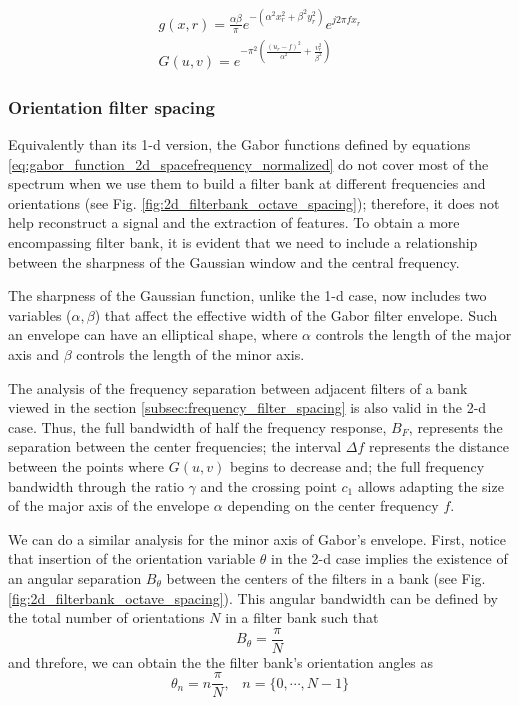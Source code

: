 \begin{equation}\label{eq:gabor_function_2d_spacefrequency_normalized}
    \begin{gathered}
        g(x, r) = \frac{\alpha \beta}{\pi} e ^{-\left(\alpha^2 x_r^2 + \beta^2 y_r^2\right)} e ^{j 2 \pi f x_r } \\
        G(u, v) =   e ^{- \pi^2 \left(\frac{\left( u_r - f\right)^2}{\alpha^2} + \frac{v_r^2}{\beta^2}\right)} 
     \end{gathered}
\end{equation}

\subsubsection{Orientation filter spacing}

Equivalently than its 1-d version, the Gabor functions defined by equations \eqref{eq:gabor_function_2d_spacefrequency_normalized} do not cover most of the spectrum when we use them to build a filter bank at different frequencies and orientations (see Fig. \ref{fig:2d_filterbank_octave_spacing}); therefore, it does not help reconstruct a signal and the extraction of features. To obtain a more encompassing filter bank, it is evident that we need to include a relationship between the sharpness of the Gaussian window and the central frequency. 

The sharpness of the Gaussian function, unlike the 1-d case, now includes two variables ($\alpha, \beta$) that affect the effective width of the Gabor filter envelope. Such an envelope can have an elliptical shape, where $\alpha $ controls the length of the major axis and $\beta$ controls the length of the minor axis. 

The analysis of the frequency separation between adjacent filters of a bank viewed in the section \ref{subsec:frequency_filter_spacing} is also valid in the 2-d case. Thus, the full bandwidth of half the frequency response, $B_F$, represents the separation between the center frequencies; the interval $\Delta f$ represents the distance between the points where $G(u, v)$ begins to decrease and; the full frequency bandwidth through the ratio $\gamma$ and the crossing point $c_1$ allows adapting the size of the major axis of the envelope $\alpha$ depending on the center frequency $f$.

We can do a similar analysis for the minor axis of Gabor's envelope. First, notice that insertion of the orientation variable $\theta$ in the 2-d case implies the existence of an angular separation $B_{\theta}$ between the centers of the filters in a bank (see Fig. \ref{fig:2d_filterbank_octave_spacing}). This angular bandwidth can be defined by the total number of orientations $N$ in a filter bank such that
\begin{equation}\label{eq:angular_bandwidth}
    B_{\theta} = \frac{\pi}{N}
\end{equation}
and threfore, we can obtain the the filter bank's orientation angles as 
\begin{equation}\label{eq:filterbank_angles}
    \theta_n = n \frac{\pi}{N} \textrm{,} \quad n = \{0, \cdots, N-1\}
\end{equation}

